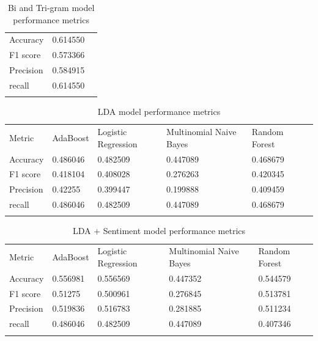 \documentclass[paper=a4, fontsize=11pt]{scrartcl} %
\numberwithin{equation}{section} %
\numberwithin{figure}{section} %
\numberwithin{table}{section} %
\begin{document}
\begin{table}[!htb]
 \centering
 \caption{Bi and Tri-gram model performance metrics}
 \label{bow_performance}
 \begin{tabular}{l l l} 
    \noalign{\smallskip}\hline\noalign{\smallskip}
    Accuracy & 0.614550\\
    F1 score & 0.573366\\
    Precision & 0.584915\\
    recall & 0.614550\\
    \noalign{\smallskip}\hline
  \end{tabular} 
\end{table}  

\begin{table}[!htb]
 \centering
 \caption{LDA model performance metrics}
 \label{bow_performance}
 \begin{tabular}{l l l l l l} 
    \noalign{\smallskip}\hline\noalign{\smallskip}
    Metric & AdaBoost & Logistic Regression & \multicolumn{1}{p{3cm}}{Multinomial Naive Bayes} & Random Forest\\
    \noalign{\smallskip}\hline\noalign{\smallskip}
    Accuracy & 0.486046	&0.482509	&0.447089	&0.468679\\
    F1 score & 0.418104	&0.408028	&0.276263	&0.420345\\
    Precision & 	0.42255	&0.399447	&0.199888	&0.409459\\
    recall & 	0.486046	&0.482509	&0.447089	&0.468679\\
    \noalign{\smallskip}\hline
  \end{tabular}
\end{table}  

\begin{table}[!htb]
 \centering
 \caption{LDA + Sentiment model performance metrics}
 \label{lda_sentiment_performance}
 \begin{tabular}{l l l l l} 
    \noalign{\smallskip}\hline\noalign{\smallskip}
    Metric & AdaBoost & Logistic Regression & \multicolumn{1}{p{3cm}}{Multinomial Naive Bayes}& Random Forest\\
    \noalign{\smallskip}\hline\noalign{\smallskip}
    Accuracy & 0.556981	&0.556569	&0.447352	&0.544579\\
    F1 score & 0.51275 &0.500961	&0.276845	&0.513781\\
    Precision & 0.519836 &0.516783	&0.281885 &0.511234\\
    recall & 0.486046	&0.482509	&0.447089	&0.407346\\
    \noalign{\smallskip}\hline
  \end{tabular} 
\end{table}  
\end{document}
